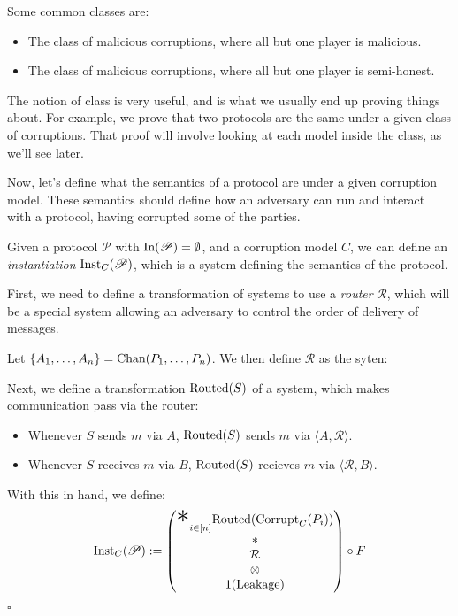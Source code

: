Some common classes are:
\begin{itemize}
  \item The class of malicious corruptions, where all but one player is malicious.
  \item The class of malicious corruptions, where all but one player is semi-honest.
\end{itemize}

The notion of class is very useful, and is what we usually end up proving
things about.
For example, we prove that two protocols are the same under a given
class of corruptions.
That proof will involve looking at each model inside the class,
as we'll see later.

Now, let's define what the semantics of a protocol are under
a given corruption model.
These semantics should define how an adversary can run and interact
with a protocol, having corrupted some of the parties.

\begin{definition}[Instantiation]
  Given a protocol $\mathscr{P}$ with $\text{In}(\mathscr{P}) = \emptyset$, and a corruption model $C$, we can
  define an \emph{instantiation} $\text{Inst}_C(\mathscr{P})$, which
  is a system defining the semantics of the protocol.

  First, we need to define a transformation of systems to use
  a \emph{router} $\mathcal{R}$, which will be a special system
  allowing an adversary to control the order of delivery of messages.

  Let $\{A_1, \ldots, A_n\} = \text{Chan}(P_1, \ldots, P_n)$.
  We then define $\mathcal{R}$ as the syten:

  Next, we define a transformation $\text{Routed}(S)$ of a system,
  which makes communication pass via the router:
  \begin{itemize}
    \item Whenever $S$ sends $m$ via $A$, $\text{Routed}(S)$ sends $m$ via $\langle A , \mathcal{R} \rangle$.
    \item Whenever $S$ receives $m$ via $B$, $\text{Routed}(S)$ recieves $m$ via $\langle \mathcal{R}, B \rangle$.
  \end{itemize}

With this in hand, we define:
$$
\tx{Inst}_C(\mathscr{P}) :=
  \begin{pmatrix}
    {\displaystyle \bigast}_{i \in [n]} \tx{Routed}(\tx{Corrupt}_C(P_i))\cr
    *\cr
    \mathcal{R}\cr
    \otimes\cr
    1(\tx{Leakage})
  \end{pmatrix}
  \circ F
$$


$\square$
\end{definition}

